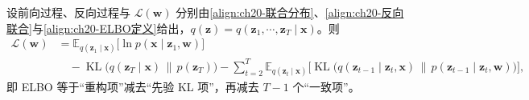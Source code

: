 \documentclass[../../main.tex]{subfiles}
\begin{document}
\begin{theorem}\label{theorem:ch20-ELBO分解}
设前向过程、反向过程与 $\mathcal{L}(\bm{w})$ 分别由\eqref{align:ch20-联合分布}、\eqref{align:ch20-反向联合}与\eqref{align:ch20-ELBO定义}给出，$q(\bm{z})=q(\bm{z}_1,\cdots,\bm{z}_T\mid\bm{x})$。则
\begin{align}
\mathcal{L}(\bm{w})&=\mathbb{E}_{q(\bm{z}_1\mid\bm{x})}\big[\ln p(\bm{x}\mid\bm{z}_1,\bm{w})\big]\nonumber\\
&\quad-\operatorname{KL}\big(q(\bm{z}_T\mid\bm{x})\,\|\,p(\bm{z}_T)\big)-\sum_{t=2}^{T}\mathbb{E}_{q(\bm{z}_t\mid\bm{x})}\Big[\operatorname{KL}\big(q(\bm{z}_{t-1}\mid\bm{z}_t,\bm{x})\,\|\,p(\bm{z}_{t-1}\mid\bm{z}_t,\bm{w})\big)\Big],
\label{align:ch20-三重分解}
\end{align}
即 ELBO 等于“重构项”减去“先验 KL 项”，再减去 $T-1$ 个“一致项”。
\end{theorem}
\end{document}
